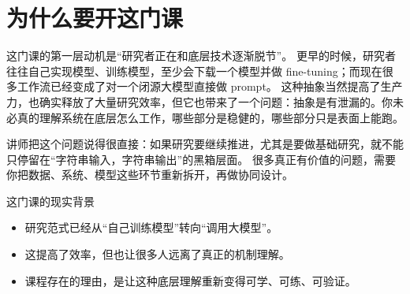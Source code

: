 \section{为什么要开这门课}

这门课的第一层动机是“研究者正在和底层技术逐渐脱节”。
更早的时候，研究者往往自己实现模型、训练模型，至少会下载一个模型并做 fine-tuning；而现在很多工作流已经变成了对一个闭源大模型直接做 prompt。
这种抽象当然提高了生产力，也确实释放了大量研究效率，但它也带来了一个问题：抽象是有泄漏的。你未必真的理解系统在底层怎么工作，哪些部分是稳健的，哪些部分只是表面上能跑。

讲师把这个问题说得很直接：如果研究要继续推进，尤其是要做基础研究，就不能只停留在“字符串输入，字符串输出”的黑箱层面。
很多真正有价值的问题，需要你把数据、系统、模型这些环节重新拆开，再做协同设计。

\begin{knowledgebox}{这门课的现实背景}
\begin{itemize}
    \item 研究范式已经从“自己训练模型”转向“调用大模型”。
    \item 这提高了效率，但也让很多人远离了真正的机制理解。
    \item 课程存在的理由，是让这种底层理解重新变得可学、可练、可验证。
\end{itemize}
\end{knowledgebox}

